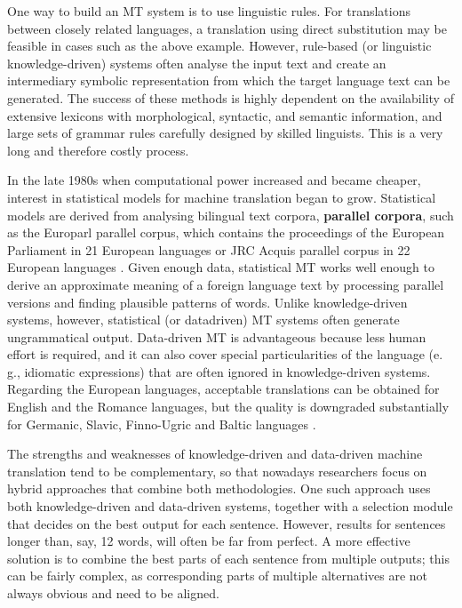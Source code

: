 \begin{multicols}{2}
One way to build an MT system is to use linguistic rules. For translations between closely related languages, a translation using direct substitution may be feasible in cases such as the above example. However, rule-based (or linguistic knowledge-driven) systems often analyse the input text and create an intermediary symbolic representation from which the target language text can be generated. The success of these methods is highly dependent on the availability of extensive lexicons with morphological, syntactic, and semantic information, and large sets of grammar rules carefully designed by skilled linguists. This is a very long and therefore costly process.

In the late 1980s when computational power increased and became cheaper, interest in statistical models for machine translation began to grow. Statistical models are derived from analysing bilingual text corpora, \textbf{parallel corpora}, such as the Europarl parallel corpus, which contains the proceedings of the European Parliament in 21 European languages or JRC Acquis parallel corpus in 22 European languages \cite{pro1}. Given enough data, statistical MT works well enough to derive an approximate meaning of a foreign language text by processing parallel versions and finding plausible patterns of words. Unlike knowledge-driven systems, however, statistical (or datadriven) MT systems often generate ungrammatical output. Data-driven MT is advantageous because less human effort is required, and it can also cover special particularities of the language (e.\,g., idiomatic expressions) that are often ignored in knowledge-driven systems. Regarding the European languages, acceptable translations can be obtained for English and the Romance languages, but the quality is downgraded substantially for Germanic, Slavic, Finno-Ugric and Baltic languages \cite{pro2}.


The strengths and weaknesses of knowledge-driven and data-driven machine translation tend to be complementary, so that nowadays researchers focus on hybrid approaches that combine both methodologies. One such approach uses both knowledge-driven and data-driven systems, together with a selection module that decides on the best output for each sentence. However, results for sentences longer than, say, 12 words, will often be far from perfect. A more effective solution is to combine the best parts of each sentence from multiple outputs; this can be fairly complex, as corresponding parts of multiple alternatives are not always obvious and need to be aligned. 


\end{multicols}
